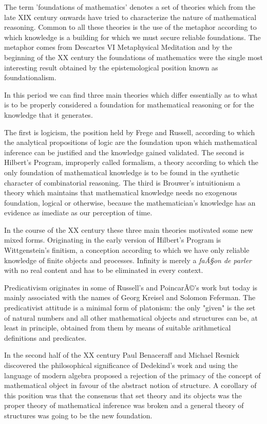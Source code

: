 \documentclass[12pt]{article}
\begin{document}
The term 'foundations of mathematics' denotes a set of theories which from the late XIX century onwards have tried to characterize the nature of mathematical reasoning. Common to all these theories is the use of the metaphor according to which knowledge is a building for which we must secure reliable foundations. The metaphor comes from Descartes VI Metaphysical Meditation and by the beginning of the XX century the foundations of mathematics were the single most interesting result obtained by the epistemological position known as foundationalism. 

In this period we can find three main theories which differ essentially as to what is to be properly considered a foundation for mathematical reasoning or for the knowledge that it generates. 

The first is logicism, the position held by Frege and Russell, according to which the analytical propositions of logic are the foundation upon which mathematical inference can be justified and the knowledge gained validated. The second is Hilbert's Program, improperly called formalism, a theory according to which the only foundation of mathematical knowledge is to be found in the synthetic character of combinatorial reasoning. The third is Brouwer's intuitionism a theory which maintains that mathematical knowledge needs no exogenous foundation, logical or otherwise, because the mathematician's knowledge has an evidence as imediate as our perception of time. 

In the course of the XX century these three main theories motivated some new mixed forms. Originating in the early version of Hilbert's Program is Wittgenstein's finitism, a conception according to which we have only reliable knowledge of finite objects and processes. Infinity is merely a \emph{faÃ§on de parler} with no real content and has to be eliminated in every context. 

Predicativism originates in some of Russell's and PoincarÃ©'s work but today is mainly associated with the names of Georg Kreisel and Solomon Feferman. The predicativist attitude is a minimal form of platonism: the only "given" is the set of natural numbers and all other mathematical objects and structures can be, at least in principle, obtained from them by means of suitable arithmetical definitions and predicates. 

In the second half of the XX century Paul Benaceraff and Michael Resnick discovered the philosophical significance of Dedekind's work and using the language of modern algebra proposed a rejection of the primacy of the concept of mathematical object in favour of the abstract notion of structure. A corollary of this position was that the consensus that set theory and its objects was the proper theory of mathematical inference was broken and a general theory of structures was going to be the new foundation. 
\end{document}
